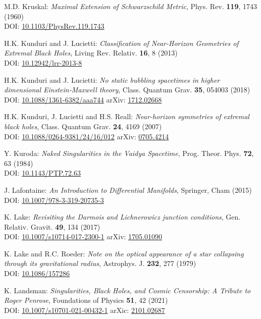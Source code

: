 \begin{thebibliography}{123}
M.D. Kruskal:
{\em Maximal Extension of Schwarzschild Metric},
Phys. Rev. {\bf 119}, 1743 (1960)\\
DOI: \href{https://doi.org/10.1103/PhysRev.119.1743}{10.1103/PhysRev.119.1743}

H.K. Kunduri and J. Lucietti:
{\em Classification of Near-Horizon Geometries of Extremal Black Holes},
Living Rev. Relativ. {\bf 16}, 8 (2013)\\
DOI: \href{https://doi.org/10.12942/lrr-2013-8}{10.12942/lrr-2013-8}

H.K. Kunduri and J. Lucietti:
{\em No static bubbling spacetimes in higher dimensional Einstein-Maxwell theory},
Class. Quantum Grav. {\bf 35}, 054003 (2018)\\
DOI: \href{https://doi.org/10.1088/1361-6382/aaa744}{10.1088/1361-6382/aaa744}\hfill
arXiv: \href{https://arxiv.org/abs/1712.02668}{1712.02668}

H.K. Kunduri, J. Lucietti and H.S. Reall:
{\em Near-horizon symmetries of extremal black holes},
Class. Quantum Grav. {\bf 24}, 4169 (2007)\\
DOI: \href{https://doi.org/10.1088/0264-9381/24/16/012}{10.1088/0264-9381/24/16/012}\hfill
arXiv: \href{https://arxiv.org/abs/0705.4214}{0705.4214}

Y. Kuroda:
{\em Naked Singularities in the Vaidya Spacetime},
Prog. Theor. Phys. {\bf 72}, 63 (1984)\\
DOI: \href{https://doi.org/10.1143/PTP.72.63}{10.1143/PTP.72.63}

J. Lafontaine: {\em An Introduction to Differential Manifolds},
Springer, Cham (2015)\\
DOI: \href{https://doi.org/10.1007/978-3-319-20735-3}{10.1007/978-3-319-20735-3}

K. Lake:
{\em Revisiting the Darmois and Lichnerowicz junction conditions},
Gen. Relativ. Gravit. {\bf 49}, 134 (2017)\\
DOI: \href{https://doi.org/10.1007/s10714-017-2300-1}{10.1007/s10714-017-2300-1}\hfill
arXiv: \href{https://arxiv.org/abs/1705.01090}{1705.01090}

K. Lake and R.C. Roeder:
{\em Note on the optical appearance of a star collapsing through its gravitational radius},
Astrophys. J. {\bf 232}, 277 (1979)\\
DOI: \href{https://doi.org/10.1086/157286}{10.1086/157286}

K. Landsman:
{\em Singularities, Black Holes, and Cosmic Censorship:
A Tribute to Roger Penrose},
Foundations of Physics {\bf 51}, 42 (2021)\\
DOI: \href{https://doi.org/10.1007/s10701-021-00432-1}{10.1007/s10701-021-00432-1}\hfill
arXic: \href{https://arxiv.org/abs/2101.02687}{2101.02687}


\end{thebibliography}
